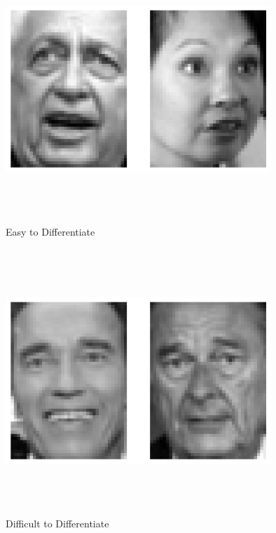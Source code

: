 \documentclass[10pt]{article}
\begin{document}
\begin{figure}[H]
  \centering
  \includegraphics[width=10cm, height=10cm]{images/4.3c_1_3.png}
  \caption{Easy to Differentiate}
  \label{fig:Clusters}
\end{figure}

\begin{figure}[H]
  \centering
  \includegraphics[width=10cm, height=10cm]{images/4.3c_2_6.png}
  \caption{Difficult to Differentiate}
  \label{fig:Clusters}
\end{figure}
\end{document}
